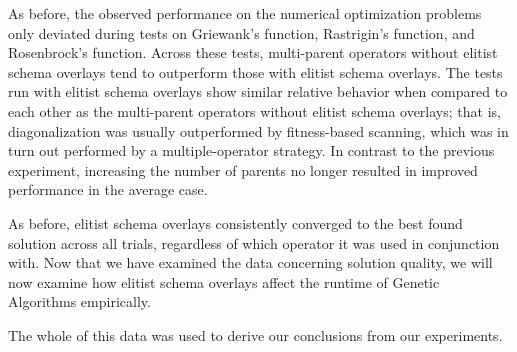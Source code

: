 %
%

As before, the observed performance on the numerical optimization problems only deviated during tests on Griewank's function, Rastrigin's function, and Rosenbrock's function. Across these tests, multi-parent operators without elitist schema overlays tend to outperform those with elitist schema overlays. The tests run with elitist schema overlays show similar relative behavior when compared to each other as the multi-parent operators without elitist schema overlays; that is, diagonalization was usually outperformed by fitness-based scanning, which was in turn out performed by a multiple-operator strategy. In contrast to the previous experiment, increasing the number of parents no longer resulted in improved performance in the average case.

%
%

%
%

As before, elitist schema overlays consistently converged to the best found solution across all trials, regardless of which operator it was used in conjunction with. Now that we have examined the data concerning solution quality, we will now examine how elitist schema overlays affect the runtime of Genetic Algorithms empirically. 

%
%

 The whole of this data was used to derive our conclusions from our experiments.